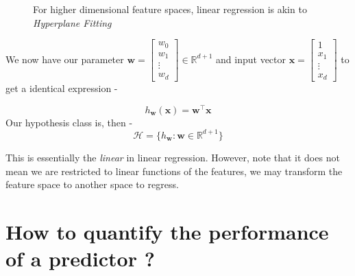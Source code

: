 \documentclass{report}
\newcommand{\tr}[1]{{{#1}^\top}} %
\newcommand{\w}{\mathbf{w}} %
\newcommand{\x}{\mathbf{x}}
\begin{document}
\begin{figure} [h]
  \centering
  \caption{For higher dimensional feature spaces, linear regression is akin to \emph{Hyperplane Fitting}}
\end{figure}

We now have our parameter \(\w = \begin{bmatrix}w_0\\w_1\\\vdots\\w_d\end{bmatrix} \in \mathbb{R}^{d+1}\) and input vector \(\x = \begin{bmatrix}1\\x_1\\\vdots\\x_d\end{bmatrix}\) to get a identical expression -

$$
  h_\w(\x) = \tr{\w} \x
$$
Our hypothesis class is, then -
$$
  \mathcal{H} = \{ h_\w : \w \in \mathbb{R}^{d+1} \}
$$

This is essentially the \textit{linear} in linear regression. However, note that it does not mean we are restricted to linear functions of the features, we may transform the feature space to another space to regress.

\section{How to quantify the performance of a predictor ?}
\end{document}
